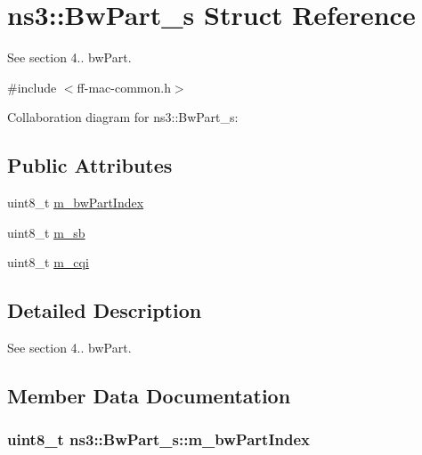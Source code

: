 \hypertarget{structns3_1_1BwPart__s}{}\section{ns3\+:\+:Bw\+Part\+\_\+s Struct Reference}
\label{structns3_1_1BwPart__s}


See section 4.. bw\+Part.  




{\ttfamily \#include $<$ff-\/mac-\/common.\+h$>$}



Collaboration diagram for ns3\+:\+:Bw\+Part\+\_\+s\+:
\subsection*{Public Attributes}
\begin{DoxyCompactItemize}
\item 
uint8\+\_\+t \hyperlink{structns3_1_1BwPart__s_a9056ab685dec25017cabb8be8da5a0d2}{m\+\_\+bw\+Part\+Index}
\item 
uint8\+\_\+t \hyperlink{structns3_1_1BwPart__s_a90ce1004412d0bb7361b6dff14233e92}{m\+\_\+sb}
\item 
uint8\+\_\+t \hyperlink{structns3_1_1BwPart__s_a5062684d47530c37039b715b2a21750e}{m\+\_\+cqi}
\end{DoxyCompactItemize}


\subsection{Detailed Description}
See section 4.. bw\+Part. 

\subsection{Member Data Documentation}
\subsubsection[{\texorpdfstring{m\+\_\+bw\+Part\+Index}{m_bwPartIndex}}]{\setlength{\rightskip}{0pt plus 5cm}uint8\+\_\+t ns3\+::\+Bw\+Part\+\_\+s\+::m\+\_\+bw\+Part\+Index}\hypertarget{structns3_1_1BwPart__s_a9056ab685dec25017cabb8be8da5a0d2}{}\label{structns3_1_1BwPart__s_a9056ab685dec25017cabb8be8da5a0d2}
